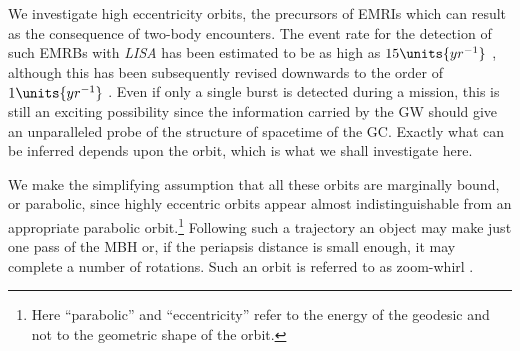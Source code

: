 \documentclass[11pt,twoside]{article}
\begin{document}
We investigate high eccentricity orbits, the precursors of EMRIs which can result as the consequence of two-body encounters. The event rate for the detection of such EMRBs with \textit{LISA} has been estimated to be as high as $15\units{yr^{-1}}$ \citep*{Rubbo2006}, although this has been subsequently revised downwards to the order of $1\units{yr^{-1}}$ \citep*{Hopman2007}. Even if only a single burst is detected during a mission, this is still an exciting possibility since the information carried by the GW should give an unparalleled probe of the structure of spacetime of the GC. Exactly what can be inferred depends upon the orbit, which is what we shall investigate here. 

We make the simplifying assumption that all these orbits are marginally bound, or parabolic, since highly eccentric orbits appear almost indistinguishable from an appropriate parabolic orbit.\footnote{Here ``parabolic'' and ``eccentricity'' refer to the energy of the geodesic and not to the geometric shape of the orbit.} Following such a trajectory an object may make just one pass of the MBH or, if the periapsis distance is small enough, it may complete a number of rotations. Such an orbit is referred to as zoom-whirl \citep{Glampedakis2002a}.

\end{document}
